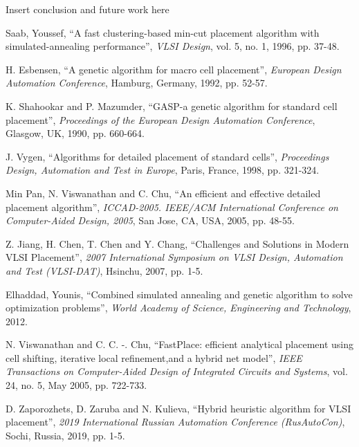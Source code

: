 \documentclass[conference]{IEEEtran}
\begin{document}
Insert conclusion and future work here


\begin{thebibliography}{00}

 Saab, Youssef, ``A fast clustering-based min-cut placement algorithm with simulated-annealing performance'', \textit{VLSI Design}, vol. 5, no. 1, 1996, pp. 37-48.

 H. Esbensen, ``A genetic algorithm for macro cell placement'', \textit{European Design Automation Conference}, Hamburg, Germany, 1992, pp. 52-57.

 K. Shahookar and P. Mazumder, ``GASP-a genetic algorithm for standard cell placement'', \textit{Proceedings of the European Design Automation Conference}, Glasgow, UK, 1990, pp. 660-664.

 J. Vygen, ``Algorithms for detailed placement of standard cells'', \textit{Proceedings Design, Automation and Test in Europe}, Paris, France, 1998, pp. 321-324.

 Min Pan, N. Viswanathan and C. Chu, ``An efficient and effective detailed placement algorithm'', \textit{ICCAD-2005. IEEE/ACM International Conference on Computer-Aided Design, 2005}, San Jose, CA, USA, 2005, pp. 48-55.

 Z. Jiang, H. Chen, T. Chen and Y. Chang, ``Challenges and Solutions in Modern VLSI Placement'', \textit{2007 International Symposium on VLSI Design, Automation and Test (VLSI-DAT)}, Hsinchu, 2007, pp. 1-5.

 Elhaddad, Younis, ``Combined simulated annealing and genetic algorithm to solve optimization problems'', \textit{World Academy of Science, Engineering and Technology}, 2012.

 N. Viswanathan and C. C. -. Chu, ``FastPlace: efficient analytical placement using cell shifting, iterative local refinement,and a hybrid net model'', \textit{IEEE Transactions on Computer-Aided Design of Integrated Circuits and Systems}, vol. 24, no. 5, May 2005, pp. 722-733.

 D. Zaporozhets, D. Zaruba and N. Kulieva, ``Hybrid heuristic algorithm for VLSI placement'', \textit{2019 International Russian Automation Conference (RusAutoCon)}, Sochi, Russia, 2019, pp. 1-5.


\end{thebibliography}
\end{document}
